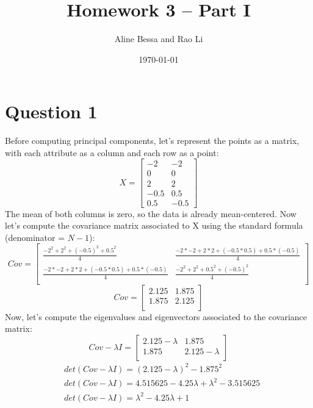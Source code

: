 \documentclass[leqno]{article}
\title{Homework 3 -- Part I}
\author{Aline Bessa and Rao Li}
\date\today
\begin{document}
\maketitle %

\section*{Question 1} Before computing principal components, let's represent the points as a matrix, with each attribute as a column and 
each row as a point:
\[
X=
  \begin{bmatrix}
    -2 & -2 \\
     0 & 0 \\
     2 & 2 \\
  -0.5 & 0.5 \\
   0.5 & -0.5 
  \end{bmatrix}
\]
The mean of both columns is zero, so the data is already mean-centered. Now let's compute the covariance matrix associated to X  
using the standard formula (denominator = $N - 1$): 
\hfill
\[
Cov=
  \begin{bmatrix}
  \frac{-2^2 + 2^2 + (-0.5)^2 + 0.5^2}{4} & \frac{-2*-2 + 2*2 + (-0.5*0.5) + 0.5*(-0.5)}{4} \\
  \frac{-2*-2 + 2*2 + (-0.5*0.5) + 0.5*(-0.5)}{4} & \frac{-2^2 + 2^2 + 0.5^2 + (-0.5)^2}{4}\\ 
  \end{bmatrix}
\]
\[
Cov=
  \begin{bmatrix}
  2.125 & 1.875 \\
  1.875 & 2.125\\ 
  \end{bmatrix}
\]
Now, let's compute the eigenvalues and eigenvectors associated to the covariance matrix:
\[
Cov - \lambda I=
  \begin{bmatrix}
  2.125 - \lambda & 1.875 \\
  1.875 & 2.125 -\lambda\\ 
  \end{bmatrix}
\]
\begin{equation*}
\begin{split}
&det(Cov - \lambda I)= (2.125 - \lambda)^2 - 1.875^2 \\
&det(Cov - \lambda I)= 4.515625 - 4.25\lambda + \lambda^2 - 3.515625 \\
&det(Cov - \lambda I)= \lambda^2 - 4.25\lambda + 1 \\
\end{split}
\end{equation*}
\end{document}
